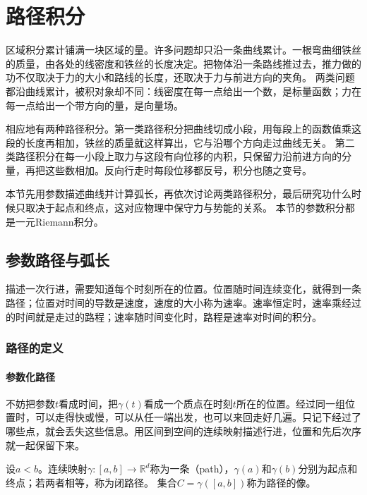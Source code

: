\par{}
\section{路径积分}
\label{sec:multivariable-path-integration}

区域积分累计铺满一块区域的量。许多问题却只沿一条曲线累计。一根弯曲细铁丝的质量，由各处的线密度和铁丝的长度决定。把物体沿一条路线推过去，推力做的功不仅取决于力的大小和路线的长度，还取决于力与前进方向的夹角。
两类问题都沿曲线累计，被积对象却不同：线密度在每一点给出一个数，是标量函数；力在每一点给出一个带方向的量，是向量场。

相应地有两种路径积分。第一类路径积分把曲线切成小段，用每段上的函数值乘这段的长度再相加，铁丝的质量就这样算出，它与沿哪个方向走过曲线无关。
第二类路径积分在每一小段上取力与这段有向位移的内积，只保留力沿前进方向的分量，再把这些数相加。反向行走时每段位移都反号，积分也随之变号。

本节先用参数描述曲线并计算弧长，再依次讨论两类路径积分，最后研究功什么时候只取决于起点和终点，这对应物理中保守力与势能的关系。
本节的参数积分都是一元Riemann积分。

\subsection{参数路径与弧长}
\label{sec:multivariable-line-integrals}

描述一次行进，需要知道每个时刻所在的位置。位置随时间连续变化，就得到一条路径；位置对时间的导数是速度，速度的大小称为速率。速率恒定时，速率乘经过的时间就是走过的路程；速率随时间变化时，路程是速率对时间的积分。

\subsubsection{路径的定义}

\paragraph{参数化路径}

不妨把参数$t$看成时间，把$\gamma(t)$看成一个质点在时刻$t$所在的位置。经过同一组位置时，可以走得快或慢，可以从任一端出发，也可以来回走好几遍。只记下经过了哪些点，就会丢失这些信息。用区间到空间的连续映射描述行进，位置和先后次序就一起保留下来。
\begin{definition}[路径]
设$a<b$。连续映射$\gamma:[a,b]\to\mathbb R^d$称为一条（path），$\gamma(a)$和$\gamma(b)$分别为起点和终点；若两者相等，称为闭路径。
集合$C=\gamma([a,b])$称为路径的像。
\end{definition}

